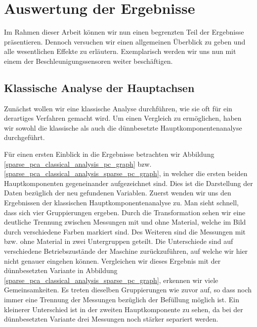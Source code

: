 

\section{Auswertung der Ergebnisse}
\label{evaluation}

Im Rahmen dieser Arbeit können wir nun einen begrenzten Teil der Ergebnisse präsentieren. Dennoch versuchen wir einen allgemeinen Überblick zu geben und alle wesentlichen Effekte zu erläutern. Exemplarisch werden wir uns nun mit einem der Beschleunigungssensoren weiter beschäftigen. 




\subsection{Klassische Analyse der Hauptachsen}

Zunächst wollen wir eine klassische Analyse durchführen, wie sie oft für ein derartiges Verfahren gemacht wird. Um einen Vergleich zu ermöglichen, haben wir sowohl die klassische als auch die dünnbesetzte Hauptkomponentenanalyse durchgeführt. 

Für einen ersten Einblick in die Ergebnisse betrachten wir Abbildung \ref{sparse_pca_classical_analysis_pc_graph} bzw. \ref{sparse_pca_classical_analysis_sparse_pc_graph}, in welcher die ersten beiden Hauptkomponenten gegeneinander aufgezeichnet sind. Dies ist die Darstellung der Daten bezüglich der neu gefundenen Variablen. Zuerst wenden wir uns den Ergebnissen der klassischen Hauptkomponentenanalyse zu. Man sieht schnell, dass sich vier Gruppierungen ergeben. Durch die Transformation sehen wir eine deutliche Trennung zwischen Messungen mit und ohne Material, welche im Bild durch verschiedene Farben markiert sind. Des Weiteren sind die Messungen mit bzw. ohne Material in zwei Untergruppen geteilt. Die Unterschiede sind auf verschiedene Betriebszustände der Maschine zurückzuführen, auf welche wir hier nicht genauer eingehen können. Vergleichen wir dieses Ergebnis mit der dünnbesetzten Variante in Abbildung \ref{sparse_pca_classical_analysis_sparse_pc_graph}, erkennen wir viele Gemeinsamkeiten. Es treten dieselben Gruppierungen wie zuvor auf, so dass noch immer eine Trennung der Messungen bezüglich der Befüllung möglich ist. Ein kleinerer Unterschied ist in der zweiten Hauptkomponente zu sehen, da bei der dünnbesetzten Variante drei Messungen noch stärker separiert werden.

